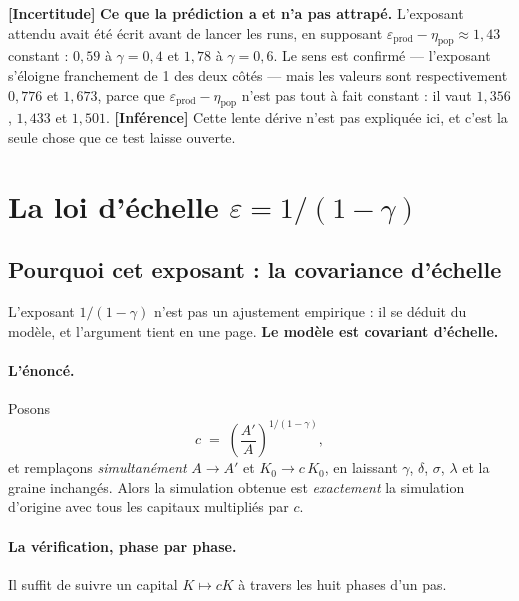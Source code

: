 \documentclass[11pt,a4paper]{article}
\newcommand{\inference}{\textbf{[Inférence]}}
\newcommand{\incertitude}{\textbf{[Incertitude]}}
\begin{document}
\incertitude{} \textbf{Ce que la prédiction a et n'a pas attrapé.} L'exposant
attendu avait été écrit avant de lancer les runs, en supposant
$\varepsilon_{\text{prod}} - \eta_{\text{pop}} \approx 1{,}43$ constant :
$0{,}59$ à $\gamma = 0{,}4$ et $1{,}78$ à $\gamma = 0{,}6$. Le sens est
confirmé --- l'exposant s'éloigne franchement de 1 des deux côtés --- mais
les valeurs sont respectivement $0{,}776$ et $1{,}673$, parce que
$\varepsilon_{\text{prod}} - \eta_{\text{pop}}$ n'est pas tout à fait
constant : il vaut $1{,}356$, $1{,}433$ et $1{,}501$. \inference{} Cette
lente dérive n'est pas expliquée ici, et c'est la seule chose que ce test
laisse ouverte.

\section{La loi d'échelle $\varepsilon = 1/(1-\gamma)$}
\label{sec:loi}

\subsection{Pourquoi cet exposant : la covariance d'échelle}
\label{sec:echelle}

L'exposant $1/(1-\gamma)$ n'est pas un ajustement empirique : il se déduit
du modèle, et l'argument tient en une page. \textbf{Le modèle est covariant
d'échelle.}

\paragraph{L'énoncé.} Posons
\begin{equation}
c \;=\; \left(\frac{A'}{A}\right)^{1/(1-\gamma)} ,
\label{eq:facteur}
\end{equation}
et remplaçons \emph{simultanément} $A \to A'$ et $K_0 \to c\,K_0$, en
laissant $\gamma$, $\delta$, $\sigma$, $\lambda$ et la graine inchangés.
Alors la simulation obtenue est \emph{exactement} la simulation d'origine
avec tous les capitaux multipliés par $c$.

\paragraph{La vérification, phase par phase.} Il suffit de suivre un capital
$K \mapsto cK$ à travers les huit phases d'un pas.
\end{document}
